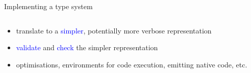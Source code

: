 \documentclass[]{beamer}
\newcommand{\keyword}[1]{\textcolor{blue}{#1}}
\newcommand{\lr}{\textsc{LabMate}}
\begin{document}
\begin{frame}{Implementing a type system}
\begin{columns}
\begin{column}{0.55\textwidth}
\begin{itemize}[<+->]
      \vspace{0.5em}\item translate to a \keyword{simpler}, potentially more verbose representation
      \vspace{0.2em}\item \keyword{validate} and \keyword{check} the simpler representation
      \vspace{1em}\item optimisations, environments for code execution, emitting native code, etc.
    \end{itemize}
  \end{column}
  \end{columns}
\end{frame}

\end{document}
